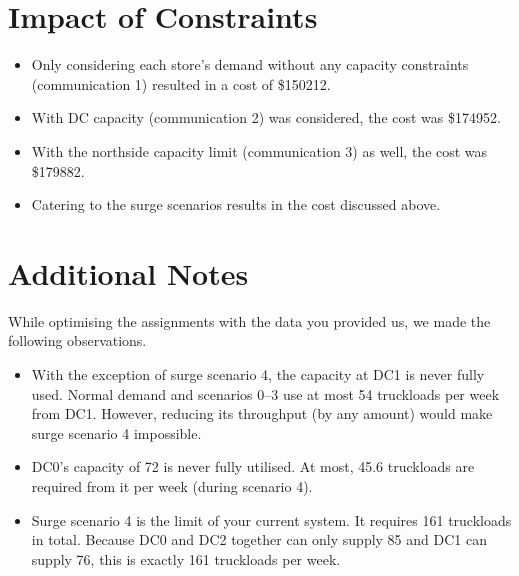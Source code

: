 \documentclass[11pt,a4paper]{article}
\begin{document}
\part{Impact of Constraints}
\begin{itemize}
    \item Only considering each store's demand without any capacity constraints 
(communication 1) resulted in a cost of \$150212.

\item With DC capacity (communication 2) was considered, the cost was  \$174952.

\item With the northside capacity limit (communication 3) as well, the cost was \$179882.

\item Catering to the surge scenarios results in the cost discussed above.
\end{itemize}

\part{Additional Notes}
While optimising the assignments with the data you provided us, we made 
the following observations.
\begin{itemize}
    \item With the exception of surge scenario 4, the capacity at DC1 is never 
fully used. Normal demand and scenarios 0--3 use at most 54 truckloads per week 
from DC1. However, reducing its throughput (by any amount) would make surge scenario 4
impossible.
    \item DC0's capacity of 72 is never fully utilised. At most, 45.6 truckloads are 
    required from it per week (during scenario 4).
    \item Surge scenario 4 is the limit of your current system. It requires 161 truckloads 
    in total. Because DC0 and DC2 together can only supply 85 and DC1 can supply 76, this is 
    exactly 161 truckloads per week. 
\end{itemize}
\end{document}
